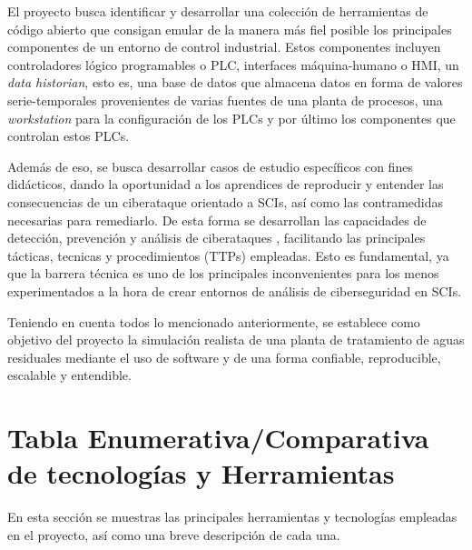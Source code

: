 \documentclass{article}
\begin{document}
El proyecto busca identificar y desarrollar una colección de herramientas de código abierto que consigan emular de la manera más fiel posible los principales componentes de un entorno de control industrial. Estos componentes incluyen controladores lógico programables o PLC, interfaces máquina-humano o HMI, un \textit{data historian}, esto es, una base de datos que almacena datos en forma de valores serie-temporales provenientes de varias fuentes de una planta de procesos, una \textit{workstation} para la configuración de los PLCs y por último los componentes que controlan estos PLCs.

Además de eso, se busca desarrollar casos de estudio específicos con fines didácticos, dando la oportunidad a los aprendices de reproducir y entender las consecuencias de un ciberataque orientado a SCIs, así como las contramedidas necesarias para remediarlo. De esta forma se desarrollan las capacidades de detección, prevención y análisis de ciberataques , facilitando las principales tácticas, tecnicas y procedimientos (TTPs) empleadas. Esto es fundamental, ya que la barrera técnica es uno de los principales inconvenientes para los menos experimentados a la hora de crear entornos de análisis de ciberseguridad en SCIs.

Teniendo en cuenta todos lo mencionado anteriormente, se establece como objetivo del proyecto la simulación realista de una planta de tratamiento de aguas residuales mediante el uso de software y de una forma confiable, reproducible, escalable y entendible.

\clearpage

\section{Tabla Enumerativa/Comparativa de tecnologías y Herramientas}
En esta sección se muestras las principales herramientas y tecnologías empleadas en el proyecto, así como una breve descripción de cada una.
\end{document}
